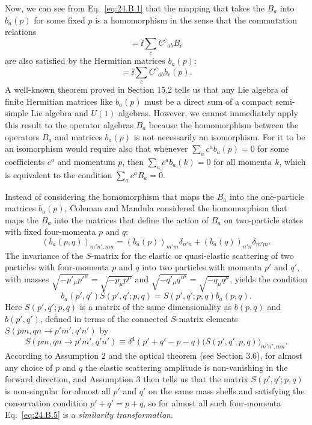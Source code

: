 Now, we can see from Eq.~\eqref{eq:24.B.1} that the mapping that takes the
$B_a$ into $b_a(p)$ for some fixed $p$ is a homomorphism in the sense
that the commutation relations
\begin{equation}
 [B_a,B_b]
 =\ii\sum_c C^c{}_{ab}B_c
\tag{24.B.2}\label{eq:24.B.2}
\end{equation}
are also satisfied by the Hermitian matrices $b_a(p)$:
\begin{equation}
 [b_a(p),b_b(p)]
 =\ii\sum_c C^c{}_{ab}b_c(p).
\tag{24.B.3}\label{eq:24.B.3}
\end{equation}
A well-known theorem proved in Section 15.2 tells us that any Lie algebra of
finite Hermitian matrices like $b_a(p)$ must be a direct sum of a compact
semi-simple Lie algebra and $U(1)$ algebras. However, we cannot immediately
apply this result to the operator algebras $B_a$ because the homomorphism
between the operators $B_a$ and matrices $b_a(p)$ is not necessarily
an isomorphism. For it to be an isomorphism would require also that whenever
$\sum_a c^a b_a(p)=0$ for some coefficients $c^a$ and
momentum $p$, then $\sum_a c^a b_a(k)=0$ for all momenta $k$,
which is equivalent to the condition $\sum_a c^a B_a=0$.

Instead of considering the homomorphism that maps the $B_a$ into the
one-particle matrices $b_a(p)$, Coleman and Mandula considered the
homomorphism that maps the $B_a$ into the matrices that define the action
of $B_a$ on two-particle states with fixed four-momenta $p$ and $q$:
\begin{equation}
 (b_a(p,q))_{m'n',mn}
 =(b_a(p))_{m'm}\delta_{n'n}
 +(b_a(q))_{n'n}\delta_{m'm}.
\tag{24.B.4}\label{eq:24.B.4}
\end{equation}
The invariance of the $S$-matrix for the elastic or quasi-elastic scattering
of two particles with four-momenta $p$ and $q$ into two particles with momenta
$p'$ and $q'$, with masses
$\sqrt{-p'_\mu p'^\mu}=\sqrt{-p_\mu p^\mu}$ and
$\sqrt{-q'_\mu q'^\mu}=\sqrt{-q_\mu q^\mu}$, yields the condition
\begin{equation}
 b_a(p',q')S(p',q';p,q)
 =S(p',q';p,q)b_a(p,q).
\tag{24.B.5}\label{eq:24.B.5}
\end{equation}
Here $S(p',q';p,q)$ is a matrix of the same dimensionality as $b(p,q)$ and
$b(p',q')$, defined in terms of the connected $S$-matrix elements
$S(pm,qn\mathbin{\to}p'm',q'n')$ by
\begin{equation}
 S(pm,qn\mathbin{\to}p'm',q'n')
 \equiv\delta^4(p'+q'-p-q)
 \bigl(S(p',q';p,q)\bigr)_{m'n',mn}.
\tag{24.B.6}\label{eq:24.B.6}
\end{equation}
According to Assumption 2 and the optical theorem (see Section 3.6), for almost
any choice of $p$ and $q$ the elastic scattering amplitude is non-vanishing in
the forward direction, and Assumption 3 then tells us that the matrix
$S(p',q';p,q)$ is non-singular for almost all $p'$ and $q'$ on the same mass
shells and satisfying the conservation condition $p'+q'=p+q$, so for almost
all such four-momenta Eq.~\eqref{eq:24.B.5} is a \emph{similarity
transformation}.

